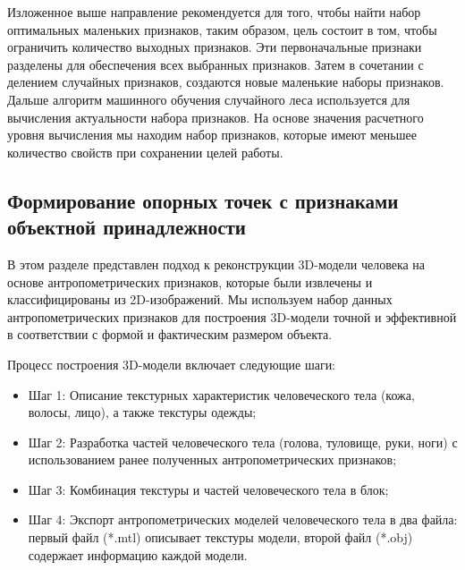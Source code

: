 Изложенное выше направление рекомендуется для того, чтобы найти набор оптимальных маленьких признаков, таким образом, цель состоит в том, чтобы ограничить количество выходных признаков. Эти первоначальные признаки разделены для обеспечения всех выбранных признаков. Затем в сочетании с делением случайных признаков, создаются новые маленькие наборы признаков. Дальше алгоритм машинного обучения случайного леса используется для вычисления актуальности набора признаков. На основе значения расчетного уровня вычисления мы находим набор признаков, которые имеют меньшее количество свойств при сохранении целей работы.
\subsection{Формирование опорных точек с признаками объектной принадлежности}
В этом разделе представлен подход к реконструкции 3D-модели человека на основе антропометрических признаков, которые были извлечены и классифицированы из 2D-изображений. Мы используем набор данных  антропометрических признаков для построения 3D-модели точной и эффективной в соответствии с формой и фактическим размером объекта.

Процесс построения 3D-модели включает следующие шаги:

\begin{itemize}
	\item Шаг 1: Описание текстурных характеристик человеческого тела (кожа, волосы, лицо), а также текстуры одежды;
   \item Шаг 2: Разработка частей человеческого тела (голова, туловище, руки, ноги) с использованием ранее полученных антропометрических признаков;
\item Шаг 3: Комбинация текстуры и частей человеческого тела в блок;
\item Шаг 4: Экспорт антропометрических моделей человеческого тела в два файла: первый файл (*.mtl) описывает текстуры модели, второй файл (*.obj) содержает информацию каждой модели.
\end{itemize}

